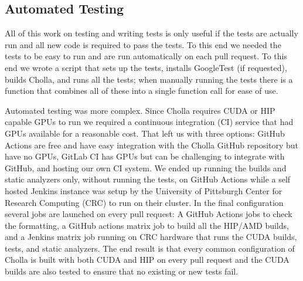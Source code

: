 \subsection{Automated Testing}

All of this work on testing and writing tests is only useful if the tests are actually run and all new code is required to pass the tests. To this end we needed the tests to be easy to run and are run automatically on each pull request. To this end we wrote a script that sets up the tests, installs GoogleTest (if requested), builds Cholla, and runs all the tests; when manually running the tests there is a function that combines all of these into a single function call for ease of use. 

Automated testing was more complex. Since Cholla requires CUDA or HIP capable GPUs to run we required a continuous integration (CI) service that had GPUs available for a reasonable cost. That left us with three options: GitHub Actions are free and have easy integration with the Cholla GitHub repository but have no GPUs, GitLab CI has GPUs but can be challenging to integrate with GitHub, and hosting our own CI system. We ended up running the builds and static analyzers only, without running the tests, on GitHub Actions while a self hosted Jenkins instance was setup by the University of Pittsburgh Center for Research Computing (CRC) to run on their cluster. In the final configuration several jobs are launched on every pull request: A GitHub Actions jobs to check the formatting, a GitHub actions matrix job to build all the HIP/AMD builds, and a Jenkins matrix job running on CRC hardware that runs the CUDA builds, tests, and static analyzers. The end result is that every common configuration of Cholla is built with both CUDA and HIP on every pull request and the CUDA builds are also tested to ensure that no existing or new tests fail. 



